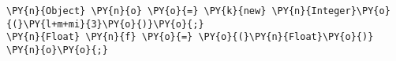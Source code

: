 \begin{Verbatim}[commandchars=\\\{\}]
\PY{n}{Object} \PY{n}{o} \PY{o}{=} \PY{k}{new} \PY{n}{Integer}\PY{o}{(}\PY{l+m+mi}{3}\PY{o}{)}\PY{o}{;}
\PY{n}{Float} \PY{n}{f} \PY{o}{=} \PY{o}{(}\PY{n}{Float}\PY{o}{)} \PY{n}{o}\PY{o}{;}
\end{Verbatim}
